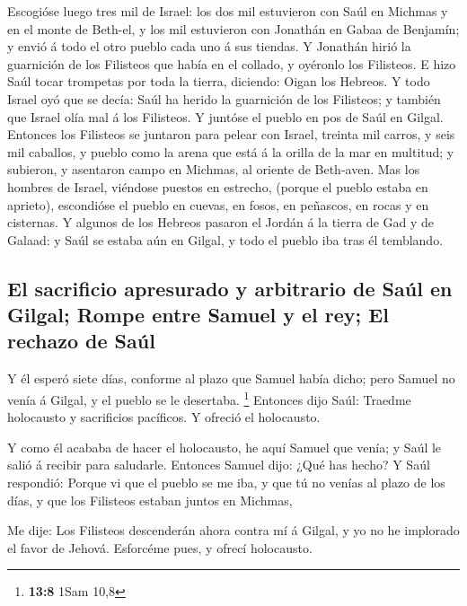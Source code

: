  Escogióse luego tres mil de Israel: los dos mil estuvieron
con Saúl en Michmas y en el monte de Beth-el, y los mil estuvieron con
Jonathán en Gabaa de Benjamín; y envió á todo el otro pueblo cada uno á
sus tiendas.  Y Jonathán hirió la guarnición de los
Filisteos que había en el collado, y oyéronlo los Filisteos. E hizo Saúl
tocar trompetas por toda la tierra, diciendo: Oigan los Hebreos.
 Y todo Israel oyó que se decía: Saúl ha herido la
guarnición de los Filisteos; y también que Israel olía mal á los
Filisteos. Y juntóse el pueblo en pos de Saúl en Gilgal. 
Entonces los Filisteos se juntaron para pelear con Israel, treinta mil
carros, y seis mil caballos, y pueblo como la arena que está á la orilla
de la mar en multitud; y subieron, y asentaron campo en Michmas, al
oriente de Beth-aven.  Mas los hombres de Israel, viéndose
puestos en estrecho, (porque el pueblo estaba en aprieto), escondióse el
pueblo en cuevas, en fosos, en peñascos, en rocas y en cisternas.
 Y algunos de los Hebreos pasaron el Jordán á la tierra de
Gad y de Galaad: y Saúl se estaba aún en Gilgal, y todo el pueblo iba
tras él temblando.

\hypertarget{el-sacrificio-apresurado-y-arbitrario-de-sauxfal-en-gilgal-rompe-entre-samuel-y-el-rey-el-rechazo-de-sauxfal}{%
\subsection{El sacrificio apresurado y arbitrario de Saúl en Gilgal;
Rompe entre Samuel y el rey; El rechazo de
Saúl}\label{el-sacrificio-apresurado-y-arbitrario-de-sauxfal-en-gilgal-rompe-entre-samuel-y-el-rey-el-rechazo-de-sauxfal}}

 Y él esperó siete días, conforme al plazo que Samuel había
dicho; pero Samuel no venía á Gilgal, y el pueblo se le desertaba.
\footnote{\textbf{13:8} 1Sam 10,8}  Entonces dijo Saúl:
Traedme holocausto y sacrificios pacíficos. Y ofreció el holocausto.

 Y como él acababa de hacer el holocausto, he aquí Samuel
que venía; y Saúl le salió á recibir para saludarle. 
Entonces Samuel dijo: ¿Qué has hecho? Y Saúl respondió: Porque vi que el
pueblo se me iba, y que tú no venías al plazo de los días, y que los
Filisteos estaban juntos en Michmas,

 Me dije: Los Filisteos descenderán ahora contra mí á
Gilgal, y yo no he implorado el favor de Jehová. Esforcéme pues, y
ofrecí holocausto.

